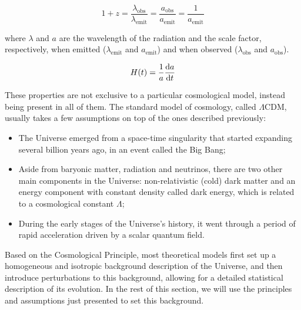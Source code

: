 \documentclass[openany,a4paper,12pt,oneside]{book}
\begin{document}
\begin{spacing}{1.5}
\begin{equation}\label{1+z}
    1+z=\frac{\lambda_{\text{obs}}}{\lambda_\text{emit}}=\frac{a_\text{obs}}{a_\text{emit}}=\frac{1}{a_\text{emit}}
\end{equation}

\noindent where $\lambda$ and $a$ are the wavelength of the radiation and the scale factor, respectively, when emitted ($\lambda_\text{emit}$ and $a_\text{emit}$) and when observed ($\lambda_\text{obs}$ and $a_\text{obs}$).


\begin{equation}\label{def:H(t)}
    H(t)=\frac{1}{a}\dv{a}{t}
\end{equation}

These properties are not exclusive to a particular cosmological model, instead being present in all of them. The standard model of cosmology, called $\Lambda$CDM, usually takes a few assumptions on top of the ones described previously:

\begin{itemize}
    \item The Universe emerged from a space-time singularity that started expanding several billion years ago, in an event called the Big Bang;
    \item Aside from baryonic matter, radiation and neutrinos, there are two other main components in the Universe: non-relativistic (cold) dark matter and an energy component with constant density called dark energy, which is related to a cosmological constant $\Lambda$;
    \item During the early stages of the Universe's history, it went through a period of rapid acceleration driven by a scalar quantum field.
\end{itemize}


Based on the Cosmological Principle, most theoretical models first set up a homogeneous and isotropic background description of the Universe, and then introduce perturbations to this background, allowing for a detailed statistical description of its evolution. In the rest of this section, we will use the principles and assumptions just presented to set this background.


\end{spacing}
\end{document}
